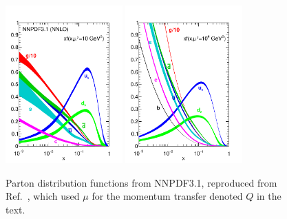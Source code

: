 \begin{figure}[htbp]
  \begin{center}
    \includegraphics[width=0.4\textwidth]{standardModel/nnpdf31nnlo-10.pdf}
    \includegraphics[width=0.4\textwidth]{standardModel/nnpdf31nnlo-1e4.pdf}
    \caption[Parton distribution functions]{
        Parton distribution functions from NNPDF3.1, reproduced from Ref.~\cite{Ball:2017nwa}, which used $\mu$ for the momentum transfer denoted $Q$ in the text.
      }\label{fig:nnpdf}
  \end{center}
\end{figure}

